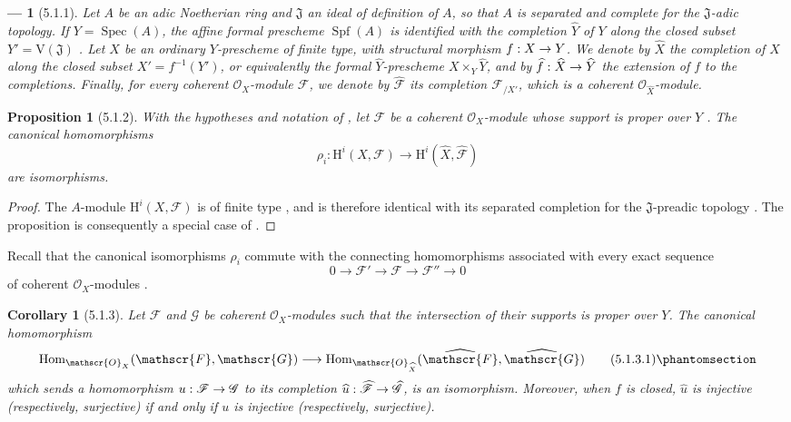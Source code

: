 \documentclass[oneside]{amsart}
\theoremstyle{ega-env-style}
\newtheorem*{env}{---}
\theoremstyle{ega-thm-env-style}
\newtheorem*{proposition}{Proposition}
\newtheorem*{corollary}{Corollary}
\theoremstyle{ega-defn-env-style}
\def\mathcal{\mathscr}
\def\sh{\mathcal}                   %
\def\HH{\mathrm{H}}                 %
\def\Hom{\operatorname{Hom}}
\def\Spec{\operatorname{Spec}}
\def\Spf{\operatorname{Spf}}
\renewcommand{\to}{\mathchoice{\longrightarrow}{\rightarrow}{\rightarrow}{\rightarrow}}
\let\EGAOriginalLabel\label
\renewcommand{\label}[1]{\phantomsection\EGAOriginalLabel{#1}}
\begin{document}
\begin{env}[5.1.1]
\label{III.5.1.1}
Let $A$ be an adic Noetherian ring and $\mathfrak{J}$ an ideal of
definition of $A$, so that $A$ is separated and complete for the
$\mathfrak{J}$-adic topology.  If $Y=\Spec(A)$, the affine formal
prescheme $\Spf(A)$ is identified with the completion
$\widehat{Y}$ of $Y$ along the closed subset
$Y'=\mathrm{V}(\mathfrak{J})$ .  Let $X$ be an
ordinary $Y$-prescheme of finite type, with structural morphism
$f:X\to Y$.  We denote by $\widehat{X}$ the completion of $X$ along
the closed subset $X'=f^{-1}(Y')$, or equivalently the formal
$\widehat{Y}$-prescheme $X\times_Y\widehat{Y}$, and by
$\widehat{f}:\widehat{X}\to\widehat{Y}$ the extension of $f$ to the
completions.  Finally, for every coherent $\sh{O}_X$-module
$\sh{F}$, we denote by $\widehat{\sh{F}}$ its completion
$\sh{F}_{/X'}$, which is a coherent
$\sh{O}_{\widehat{X}}$-module.
\end{env}

\begin{proposition}[5.1.2]
\label{III.5.1.2}
With the hypotheses and notation of , let $\sh{F}$
be a coherent $\sh{O}_X$-module whose support is proper over $Y$
.  The canonical homomorphisms
\[
  \rho_i:
  \HH^i(X,\sh{F})
  \longrightarrow
  \HH^i(\widehat{X},\widehat{\sh{F}})
\]
are isomorphisms.
\end{proposition}

\begin{proof}
The $A$-module $\HH^i(X,\sh{F})$ is of finite type
, and is therefore identical with its separated
completion for the $\mathfrak{J}$-preadic topology
.  The proposition is consequently a special case
of .
\end{proof}

Recall that the canonical isomorphisms $\rho_i$ commute with the
connecting homomorphisms associated with every exact sequence
\[
  0\longrightarrow\sh{F}'
  \longrightarrow\sh{F}
  \longrightarrow\sh{F}''
  \longrightarrow0
\]
of coherent $\sh{O}_X$-modules
 .

\begin{corollary}[5.1.3]
\label{III.5.1.3}
Let $\sh{F}$ and $\sh{G}$ be coherent $\sh{O}_X$-modules such that
the intersection of their supports is proper over $Y$.  The
canonical homomorphism
\[
  \Hom_{\sh{O}_X}(\sh{F},\sh{G})
  \longrightarrow
  \Hom_{\sh{O}_{\widehat{X}}}
  (\widehat{\sh{F}},\widehat{\sh{G}})
  \tag{5.1.3.1}
  \label{III.5.1.3.1.eq}
\]
which sends a homomorphism $u:\sh{F}\to\sh{G}$ to its completion
$\widehat{u}:\widehat{\sh{F}}\to\widehat{\sh{G}}$, is an
isomorphism.  Moreover, when $f$ is closed,
$\widehat{u}$ is injective (respectively, surjective) if and only
if $u$ is injective (respectively, surjective).
\end{corollary}
\end{document}
